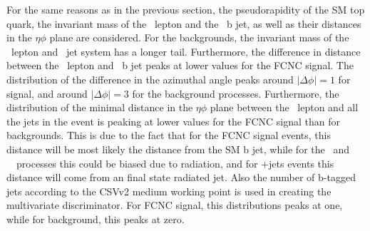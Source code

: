    For the same reasons as in the previous section, the pseudorapidity of the SM top quark,  the invariant mass of the \PW\ lepton and the \SM\ b jet, as well as their distances in the $\eta\phi$ plane are considered. For the backgrounds, the invariant mass of the \PW\ lepton and \SM\ jet system has a longer tail. Furthermore, the difference in distance  between the \PW\ lepton and \SM\ b jet peaks at lower values for the FCNC signal. The distribution of the difference in the azimuthal angle peaks around $|\Delta\phi|=1$ for signal, and around $|\Delta\phi|=3$ for the background processes. Furthermore, the distribution of the minimal distance in the $\eta\phi$ plane between the \PW\ lepton and all the jets in the event is peaking at lower values for the FCNC signal than for backgrounds. This is due to the fact that for the FCNC signal events, this distance will be most likely the distance from the SM b  jet, while for the \ttZ\ and \SM\ \tZq\ processes this could be biased due to radiation, and for \WZ+jets events this distance will come from an final state radiated jet.  Also the number of b-tagged jets according to the CSVv2 medium working point is used in creating the multivariate discriminator. For FCNC signal, this distributions peaks at one, while for background, this peaks at zero.
   
